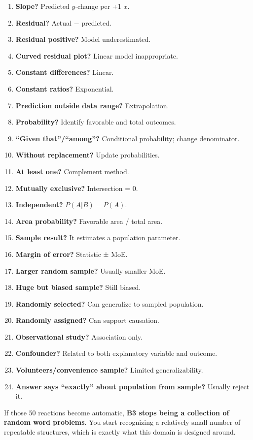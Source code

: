 \documentclass[
]{article}
\begin{document}
\begin{enumerate}
\item
  \textbf{Slope?} Predicted \(y\)-change per +1 \(x\).
\item
  \textbf{Residual?} Actual − predicted.
\item
  \textbf{Residual positive?} Model underestimated.
\item
  \textbf{Curved residual plot?} Linear model inappropriate.
\item
  \textbf{Constant differences?} Linear.
\item
  \textbf{Constant ratios?} Exponential.
\item
  \textbf{Prediction outside data range?} Extrapolation.
\item
  \textbf{Probability?} Identify favorable and total outcomes.
\item
  \textbf{``Given that''/``among''?} Conditional probability; change
  denominator.
\item
  \textbf{Without replacement?} Update probabilities.
\item
  \textbf{At least one?} Complement method.
\item
  \textbf{Mutually exclusive?} Intersection = 0.
\item
  \textbf{Independent?} \(P(A|B)=P(A)\).
\item
  \textbf{Area probability?} Favorable area / total area.
\item
  \textbf{Sample result?} It estimates a population parameter.
\item
  \textbf{Margin of error?} Statistic ± MoE.
\item
  \textbf{Larger random sample?} Usually smaller MoE.
\item
  \textbf{Huge but biased sample?} Still biased.
\item
  \textbf{Randomly selected?} Can generalize to sampled population.
\item
  \textbf{Randomly assigned?} Can support causation.
\item
  \textbf{Observational study?} Association only.
\item
  \textbf{Confounder?} Related to both explanatory variable and outcome.
\item
  \textbf{Volunteers/convenience sample?} Limited generalizability.
\item
  \textbf{Answer says ``exactly'' about population from sample?} Usually
  reject it.
\end{enumerate}

If those 50 reactions become automatic, \textbf{B3 stops being a
collection of random word problems}. You start recognizing a relatively
small number of repeatable structures, which is exactly what this domain
is designed around.
\end{document}
